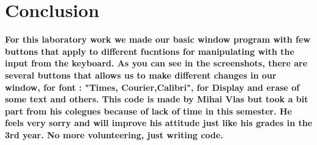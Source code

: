 \documentclass[12pt]{article}
\begin{document}
     
\section{Conclusion}

\textbf{For this laboratory work we made our basic window program with few buttons that apply to different fucntions for manipulating with the input from the keyboard. As you can see in the screenshots, there are several buttons that allows us to make different changes in our window, for font : "Times, Courier,Calibri", for Display and erase of some text and others. This code is made by Mihai Vlas but took a bit part from his colegues because of lack of time in this semester. He feels very sorry and will improve his attitude just like his grades in the 3rd year. No more volunteering, just writing code.}

  
\end{document}
